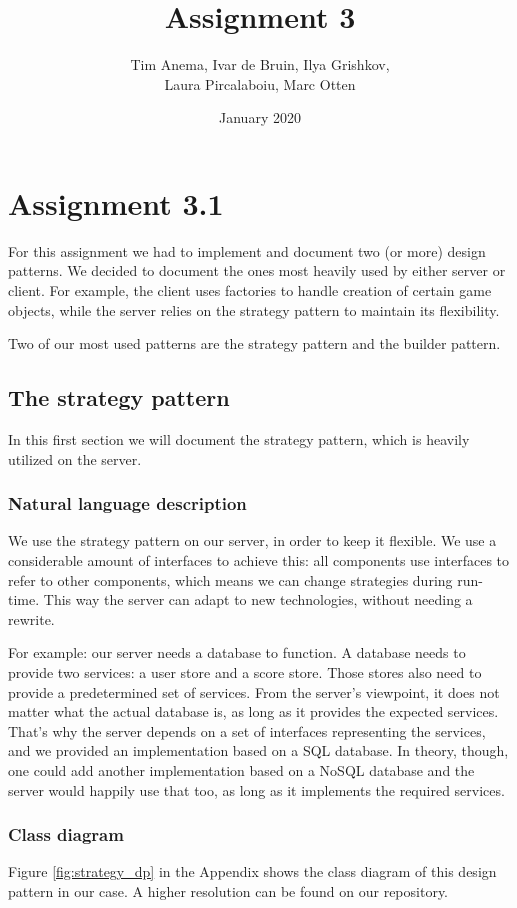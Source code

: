 \documentclass{article}
\title{Assignment 3}
\author{Tim Anema, Ivar de Bruin, Ilya Grishkov, \\Laura Pircalaboiu, Marc Otten}
\date{January 2020}
\begin{document}
\maketitle

\section{Assignment 3.1}
For this assignment we had to implement and document two (or more) design patterns. We decided to document the ones most heavily used by either server or client. For example, the client uses factories to handle creation of certain game objects, while the server relies on the strategy pattern to maintain its flexibility. 
\par Two of our most used patterns are the strategy pattern and the builder pattern. 

\subsection{The strategy pattern}
In this first section we will document the strategy pattern, which is heavily utilized on the server.

\subsubsection{Natural language description}
We use the strategy pattern on our server, in order to keep it
flexible. We use a considerable amount of interfaces to achieve this:
all components use interfaces to refer to other components, which means
we can change strategies during run-time. This way the server can adapt to
new technologies, without needing a rewrite.

\par For example: our server needs a database to function. A database needs to
provide two services: a user store and a score store. Those stores also need
to provide a predetermined set of services. From the server's viewpoint, it
does not matter what the actual database is, as long as it provides the
expected services. That's why the server depends on a set of interfaces
representing the services, and we provided an implementation based on a SQL
database. In theory, though, one could add another implementation based on
a NoSQL database and the server would happily use that too, as long as it
implements the required services.

\subsubsection{Class diagram}
Figure \ref{fig:strategy_dp} in the Appendix shows the class diagram of this design pattern in our case. A higher resolution can be found on our repository.
\end{document}
